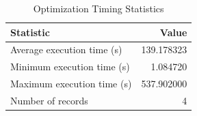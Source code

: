 
\begin{table}[h!]
\centering
\begin{tabular}{l r}
\hline
Statistic & Value \\
\hline
Average execution time (s) & 139.178323 \\
Minimum execution time (s) & 1.084720 \\
Maximum execution time (s) & 537.902000 \\
Number of records & 4 \\
\hline
\end{tabular}
\caption{Optimization Timing Statistics}
\end{table}

